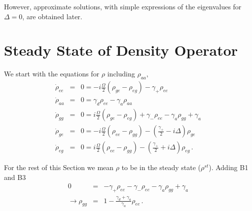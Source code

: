 \documentclass[twocolumn,aps,eqsecnum,showkeys,amsmath]{revtex4-2}
\begin{document}
However, approximate solutions, with simple expressions of the eigenvalues 
for $\Delta=0$, are obtained later. 


\section{Steady State of Density Operator} 
We start with the equations for $\rho$ including $\rho_{aa}$,
%
\begin{eqnarray}
\dot{\rho}_{ee} &=& 0 = -i\frac{\Omega}{2} (\rho_{ge} -\rho_{eg})
 	-\gamma_+ \rho_{ee}	\\ 
\dot{\rho}_{aa} &=& 0 = \gamma_d \rho_{ee} -\gamma_a \rho_{aa} \\
\dot{\rho}_{gg} &=& 0 = i\frac{\Omega}{2} (\rho_{ge} -\rho_{eg})  
 +\gamma_- \rho_{ee} -\gamma_a \rho_{gg} +\gamma_a   \\
\dot{\rho}_{ge} &=& 0 = -i\frac{\Omega}{2} (\rho_{ee} -\rho_{gg})
	-\left( \frac{\gamma_+}{2} -i\Delta \right) \rho_{ge} 	\\
\dot{\rho}_{eg} &=& 0 = i\frac{\Omega}{2} (\rho_{ee} -\rho_{gg})
	-\left( \frac{\gamma_+}{2} +i\Delta \right) \rho_{eg} 	\,.
\end{eqnarray}

For the rest of this Section we mean $\rho$ to be in the steady 
state ($\rho^{st}$). Adding B1 and B3 
%
\begin{eqnarray}
0 &=& -\gamma_+ \rho_{ee} - \gamma_- \rho_{ee} 
	-\gamma_a \rho_{gg} +\gamma_a 		\nonumber \\
\to \rho_{gg} &=& 1- \frac{\gamma_d +\gamma_a}{\gamma_a} \rho_{ee} \,.
\end{eqnarray}
\end{document}
